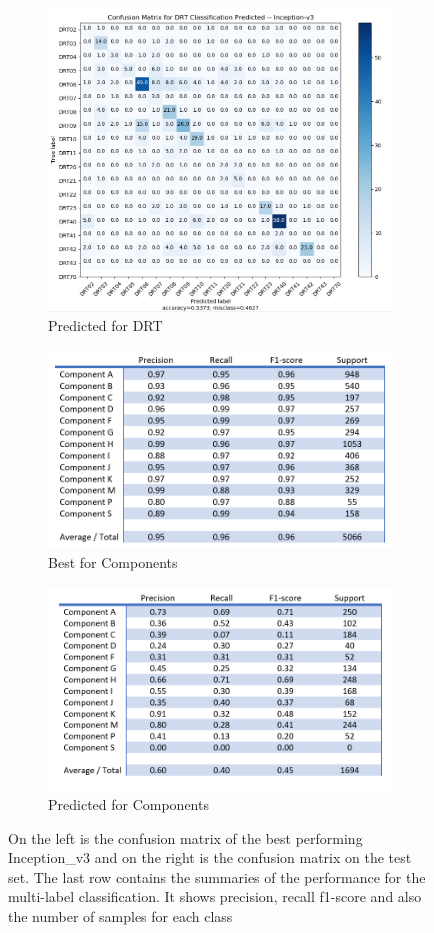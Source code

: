 \begin{figure}
\begin{subfigure}{.5\textwidth}
  \includegraphics[width=.8\linewidth]{figures/04-go_drt_pred.PNG}
  \caption{Predicted for DRT}
  \label{fig:googcmpred_drt}
\end{subfigure}
\begin{subfigure}{.5\textwidth}
  \centering
  \includegraphics[width=.8\linewidth]{figures/04-go_compo_best.PNG}
  \caption{Best for Components}
  \label{fig:googcm_comp}
\end{subfigure}%
\begin{subfigure}{.5\textwidth}
  \centering
  \includegraphics[width=.8\linewidth]{figures/04-go_compo_pred.PNG}
  \caption{Predicted for Components}
  \label{fig:googcmpred_comp}
\end{subfigure}
\caption[Confusion matrices of classes trained on Inception\_v3]{On the left is the confusion matrix of the best performing Inception\_v3 and on the right is the confusion matrix on the test set. The last row contains the summaries of the performance for the multi-label classification. It shows precision, recall f1-score and also the number of samples for each class}
\label{fig:googcm}
\end{figure}

